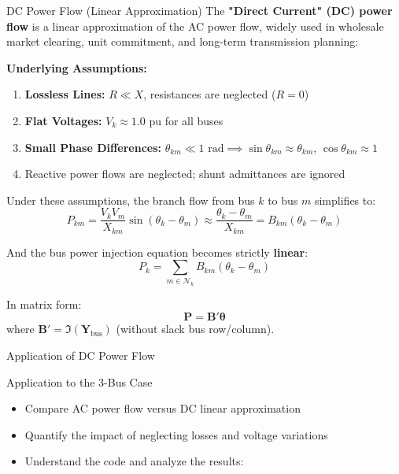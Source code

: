 \begin{frame}[allowframebreaks]{DC Power Flow (Linear Approximation)}
    The \textbf{"Direct Current" (DC) power flow} is a linear approximation of the AC power flow, widely used in wholesale market clearing, unit commitment, and long-term transmission planning:
    
    \textbf{Underlying Assumptions:}
    \begin{enumerate}
        \item \textbf{Lossless Lines:} $R \ll X$, resistances are neglected ($R = 0$)
        \item \textbf{Flat Voltages:} $V_k \approx 1.0\text{ pu}$ for all buses
        \item \textbf{Small Phase Differences:} $\theta_{km} \ll 1\text{ rad} \implies \sin\theta_{km} \approx \theta_{km}$, $\cos\theta_{km} \approx 1$
        \item Reactive power flows are neglected; shunt admittances are ignored
    \end{enumerate}
    
    \newpage
    Under these assumptions, the branch flow from bus $k$ to bus $m$ simplifies to:
    $$P_{km} = \frac{V_k V_m}{X_{km}} \sin(\theta_k - \theta_m) \approx \frac{\theta_k - \theta_m}{X_{km}} = B_{km} (\theta_k - \theta_m)$$
    
    And the bus power injection equation becomes strictly \textbf{linear}:
    $$P_k = \sum_{m \in \mathcal{N}_k} B_{km} (\theta_k - \theta_m)$$
    
    In matrix form:
    \begin{equation}
        \mathbf{P} = \mathbf{B}' \boldsymbol{\theta}
    \end{equation}
    where $\mathbf{B}' = \Im(\mathbf{Y}_{\text{bus}})$ (without slack bus row/column).
\end{frame}

\begin{frame}{Application of DC Power Flow}
    \begin{block}{Application to the 3-Bus Case}
        \begin{itemize}
            \item Compare AC power flow versus DC linear approximation
            \item Quantify the impact of neglecting losses and voltage variations
            \item Understand the code and analyze the results:
        \end{itemize}
        \vspace{0.3cm}
        \begin{center}
            \href{https://github.com/bcornelusse/ELEC0447-analysis-power-systems/tree/master/notebooks/power_flow_3-bus_DC.ipynb}{}
        \end{center}
    \end{block}
\end{frame}

